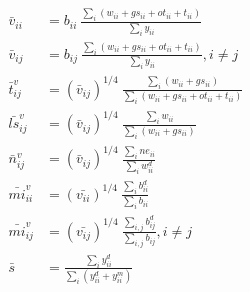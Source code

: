 \documentclass[12pt,english]{article}
\begin{document}
\begin{align*}
\bar{v}_{ii} &= b_{ii} \  \frac{\sum_i (w_{ii} + gs_{ii} + ot_{ii} + t_{ii})}{\sum_i y_{ii}}\\
\bar{v}_{ij} &= b_{ij} \ \frac{\sum_i (w_{ii} + gs_{ii} + ot_{ii} + t_{ii})}{\sum_i y_{ii}}, i\neq j \\
\bar{t}^v_{ij} &= (\bar{v}_{ij})^{1/4} \ \frac{\sum_i (w_{ii} + gs_{ii})}{\sum_i (w_{ii} + gs_{ii} + ot_{ii} + t_{ii})} \\ 
\bar{ls}^v_{ij} &=  (\bar{v}_{ij})^{1/4} \ \frac{\sum_i w_{ii}}{\sum_i (w_{ii} + gs_{ii})} \\ 
\bar{n}^v_{ij} &=  (\bar{v}_{ij})^{1/4} \ \frac{\sum_i ne_{ii}}{\sum_i w^d_{ii}} \\ 
\bar{mi}^v_{ii} &= (\bar{v_{ii}})^{1/4} \  \frac{\sum_i b^d_{ii}}{\sum_i b_{ii}} \\ 
\bar{mi}^v_{ij} &= (\bar{v_{ij}})^{1/4} \ \frac{\sum_{i,j} b^d_{ij}}{\sum_{i,j} b_{ij}}, i\neq j \\ 
\bar{s} &= \frac{\sum_i y^d_{ii}}{\sum_i (y^d_{ii} + y^m_{ii})}
\end{align*}
\end{document}
